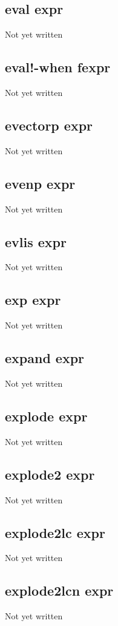 \documentclass[a4paper,11pt]{article}
\begin{document}
\subsection{\ttfamily eval expr}
Not yet written

\subsection{\ttfamily eval!-when fexpr}
Not yet written

\subsection{\ttfamily evectorp expr}
Not yet written

\subsection{\ttfamily evenp expr}
Not yet written

\subsection{\ttfamily evlis expr}
Not yet written

\subsection{\ttfamily exp expr}
Not yet written

\subsection{\ttfamily expand expr}
Not yet written

\subsection{\ttfamily explode expr}
Not yet written

\subsection{\ttfamily explode2 expr}
Not yet written

\subsection{\ttfamily explode2lc expr}
Not yet written

\subsection{\ttfamily explode2lcn expr}
Not yet written
\end{document}
